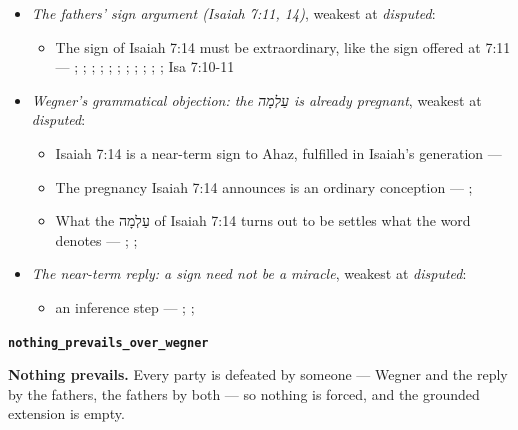 \documentclass[11pt]{article}
\begin{document}
\begin{itemize}
\item \emph{The fathers’ sign argument (Isaiah 7:11, 14)}, weakest at \emph{disputed}:
\begin{itemize}
\item The sign of Isaiah 7:14 must be extraordinary, like the sign offered at 7:11 --- \cite[I.35]{origen-against-celsus-248}; \cite[84]{justin-dialogue-with-trypho-160}; \cite[III.21.6]{irenaeus-against-heresies-180}; \cite[9]{tertullian-answer-to-the-jews-200}; \cite[VII.1]{eusebius-demonstratio-evangelica-315}; \cite[12.22]{cyril-jerusalem-catechetical-lectures-350}; \cite[5]{chrysostom-homilies-matthew-390}; \cite[ad loc. Isa 7:14]{jerome-commentary-isaiah-410}; \cite[ad loc. Isa 7:14]{cyril-alexandria-commentary-isaiah}; \cite[ad loc. Isa 7:14]{theodoret-commentary-isaiah}; \cite[474]{postell-isaiah-messianic-2025}; Isa 7:10-11
\end{itemize}
\item \emph{Wegner’s grammatical objection: the עַלְמָה is already pregnant}, weakest at \emph{disputed}:
\begin{itemize}
\item Isaiah 7:14 is a near-term sign to Ahaz, fulfilled in Isaiah’s generation --- \cite{brown-birth-messiah-1993}
\item The pregnancy Isaiah 7:14 announces is an ordinary conception --- \cite[476--478]{wegner-virgin-births-2011}; \cite[474]{postell-isaiah-messianic-2025}
\item What the עַלְמָה of Isaiah 7:14 turns out to be settles what the word denotes --- \cite[471--472]{wegner-virgin-births-2011}; \cite[468]{postell-isaiah-messianic-2025}; \cite[152]{rico-gentry-infant-king-2020}
\end{itemize}
\item \emph{The near-term reply: a sign need not be a miracle}, weakest at \emph{disputed}:
\begin{itemize}
\item an inference step --- \cite[64--65]{rhodea-did-matthew-conceive-2013}; \cite[469--470]{wegner-virgin-births-2011}; \cite[474]{postell-isaiah-messianic-2025}
\end{itemize}
\end{itemize}
\par\medskip\noindent\textbf{\texttt{nothing\_\allowbreak{}prevails\_\allowbreak{}over\_\allowbreak{}wegner}}\par\nobreak\noindent
\textbf{Nothing prevails.} Every party is defeated by someone — Wegner and the reply by the fathers, the fathers by both — so nothing is forced, and the grounded extension is empty.
\end{document}
